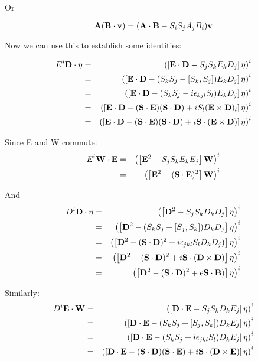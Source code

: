 Or 

$$ \mathbf{A} (\mathbf{B} \cdot \mathbf{v}) =  (\mathbf{A} \cdot \mathbf{B}   -  S_i S_j A_j B_i) \mathbf{v} $$

Now we can use this to establish some identities:

\begin{eqnarray*}
 E^i \mathbf{D} \cdot \mathbf{\eta}
	&=&	\left( \left[\mathbf{E} \cdot \mathbf{D}  - S_j S_k E_k D_j\right] \mathbf{\eta} \right)^i		\\
	&=&	\left( \left[\mathbf{E} \cdot \mathbf{D}  - (S_k S_j  - [S_k, S_j] ) E_k D_j \right] \mathbf{\eta} \right)^i \\
	&=&	\left( \left[\mathbf{E} \cdot \mathbf{D}  - (S_k S_j - i \epsilon_{kjl} S_l ) E_k D_j \right] \mathbf{\eta} \right)^i	  \\
	&=&	\left( \left[\mathbf{E} \cdot \mathbf{D}  - (\mathbf{S} \cdot \mathbf{E})( \mathbf{S} \cdot \mathbf{D}) +  i  S_l (\mathbf{E} \times \mathbf{D})_l \right] \mathbf{\eta} \right)^i	  \\
	&=&	\left( \left[\mathbf{E} \cdot \mathbf{D}  - (\mathbf{S} \cdot \mathbf{E})( \mathbf{S} \cdot \mathbf{D}) +  i  \mathbf{S} \cdot (\mathbf{E} \times \mathbf{D})\right] \mathbf{\eta} \right)^i
\end{eqnarray*}

Since E and W commute:
\begin{eqnarray*}
 E^i \mathbf{W} \cdot \mathbf{E}
	&=& \left( \left[\mathbf{E}^2  - S_j S_k E_k E_j\right] \mathbf{W} \right)^i		\\
	&=& \left( \left[\mathbf{E}^2  - (\mathbf{S} \cdot \mathbf{E} )^2 \right] \mathbf{W} \right)^i		\\
\end{eqnarray*}

And
\begin{eqnarray*}
 D^i \mathbf{D} \cdot \mathbf{\eta}
	&=& \left( \left[\mathbf{D}^2  - S_j S_k D_k D_j\right] \mathbf{\eta} \right)^i		\\
	&=& \left( \left[\mathbf{D}^2  - (S_k S_j + [S_j, S_k]) D_k D_j\right] \mathbf{\eta} \right)^i		\\
	&=& \left( \left[\mathbf{D}^2  - (\mathbf{S} \cdot \mathbf{D})^2 + i\epsilon_{jkl} S_l D_k D_j )\right] \mathbf{\eta} \right)^i		\\
	&=& \left( \left[\mathbf{D}^2  - (\mathbf{S} \cdot \mathbf{D})^2 + i\mathbf{S} \cdot (\mathbf{D} \times \mathbf{D})  \right] \mathbf{\eta} \right)^i		\\
	&=& \left( \left[\mathbf{D}^2  - (\mathbf{S} \cdot \mathbf{D})^2 + e \mathbf{S} \cdot \mathbf{B})  \right] \mathbf{\eta} \right)^i		\\
\end{eqnarray*}

Similarly:
\begin{eqnarray*}
 D^i \mathbf{E} \cdot \mathbf{W}
	&=& \left( \left[\mathbf{D} \cdot \mathbf{E}  - S_j S_k D_k E_j\right] \mathbf{\eta} \right)^i		\\
	&=& \left( \left[\mathbf{D} \cdot \mathbf{E}  -  (S_k S_j + [S_j, S_k]) D_k E_j \right] \mathbf{\eta} \right)^i		\\
	&=& \left( \left[\mathbf{D} \cdot \mathbf{E}  -  (S_k S_j +i\epsilon_{jkl} S_l) D_k E_j \right] \mathbf{\eta} \right)^i		\\
	&=& \left( \left[\mathbf{D} \cdot \mathbf{E}  - (\mathbf{S} \cdot \mathbf{D})(\mathbf{S} \cdot \mathbf{E}) + i \mathbf{S} \cdot (\mathbf{D} \times \mathbf{E})\right] \mathbf{\eta} \right)^i		\\
\end{eqnarray*}	

